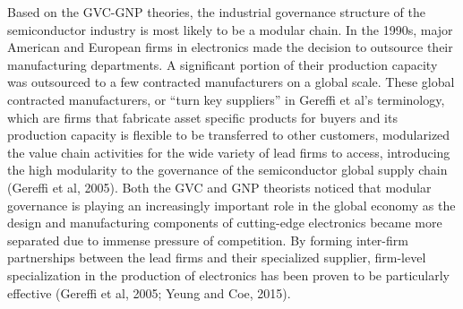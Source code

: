 \documentclass[12pt]{article}
\begin{document}
\indent Based on the GVC-GNP theories, the industrial governance structure of the semiconductor industry is most likely to be a modular chain. In the 1990s, major American and European firms in electronics made the decision to outsource their manufacturing departments. A significant portion of their production capacity was outsourced to a few contracted manufacturers on a global scale. These global contracted manufacturers, or “turn key suppliers” in Gereffi et al’s terminology, which are firms that fabricate asset specific products for buyers and its production capacity is flexible to be transferred to other customers, modularized the value chain activities for the wide variety of lead firms to access, introducing the high modularity to the governance of the semiconductor global supply chain (Gereffi et al, 2005). Both the GVC and GNP theorists noticed that modular governance is playing an increasingly important role in the global economy as the design and manufacturing components of cutting-edge electronics became more separated due to immense pressure of competition. By forming inter-firm partnerships between the lead firms and their specialized supplier, firm-level specialization in the production of electronics has been proven to be particularly effective (Gereffi et al, 2005; Yeung and Coe, 2015). 
\end{document}
